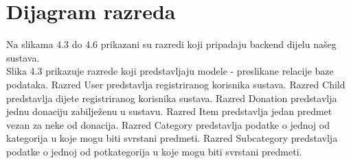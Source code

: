			
		\section{Dijagram razreda}
			
			
			
			Na slikama 4.3 do 4.6 prikazani su razredi koji pripadaju backend dijelu našeg sustava.\\[5pt]

			Slika 4.3 prikazuje razrede koji predstavljaju modele - preslikane relacije baze podataka. Razred User predstavlja registriranog korisnika sustava. Razred Child predstavlja dijete registriranog korisnika sustava. Razred Donation predstavlja jednu donaciju zabilježenu u sustavu. 
			Razred Item predstavlja jedan predmet vezan za neke od donacija. Razred Category predstavlja podatke o jednoj od kategorija u koje mogu biti svrstani predmeti. Razred Subcategory predstavlja podatke o jednoj od potkategorija u koje mogu biti svrstani predmeti.\\[10pt]

